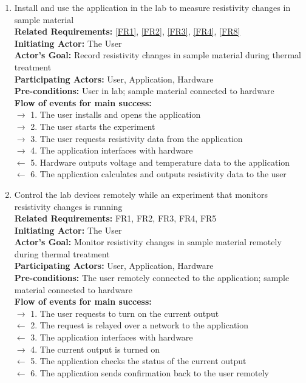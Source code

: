 \documentclass[12pt, titlepage]{article}
\begin{document}
\begin{enumerate}[{UC-}1:]
    
\item Install and use the application in the lab to measure resistivity changes in sample material \label{UC1}\\
    \textbf{Related Requirements:} \ref{FR1}, \ref{FR2}, \ref{FR3}, \ref{FR4}, \ref{FR8}\\ %
    \textbf{Initiating Actor:} The User\\
    \textbf{Actor's Goal:} Record resistivity changes in sample material during thermal treatment\\
    \textbf{Participating Actors:} User, Application, Hardware\\
    \textbf{Pre-conditions:} User in lab; sample material connected to hardware\\
    \textbf{Flow of events for main success:}\\
    $\rightarrow$ 1. The user installs and opens the application\\
    $\rightarrow$ 2. The user starts the experiment\\
    $\rightarrow$ 3. The user requests resistivity data from the application\\
    $\rightarrow$ 4. The application interfaces with hardware\\
    $\leftarrow$ 5. Hardware outputs voltage and temperature data to the application\\
    $\leftarrow$ 6. The application calculates and outputs resistivity data to the user\\

\item Control the lab devices remotely while an experiment that monitors resistivity changes is running \label{UC2}\\
    \textbf{Related Requirements:} FR1, FR2, FR3, FR4, FR5\\ %
    \textbf{Initiating Actor:} The User\\
    \textbf{Actor's Goal:} Monitor resistivity changes in sample material remotely during thermal treatment\\
    \textbf{Participating Actors:} User, Application, Hardware\\
    \textbf{Pre-conditions:} The user remotely connected to the application; sample material connected to hardware\\
    \textbf{Flow of events for main success:}\\
    $\rightarrow$ 1. The user requests to turn on the current output\\
    $\leftarrow$ 2. The request is relayed over a network to the application\\
    $\leftarrow$ 3. The application interfaces with hardware\\
    $\rightarrow$ 4. The current output is turned on\\
    $\leftarrow$ 5. The application checks the status of the current output\\
    $\leftarrow$ 6. The application sends confirmation back to the user remotely


\end{enumerate}
\end{document}
